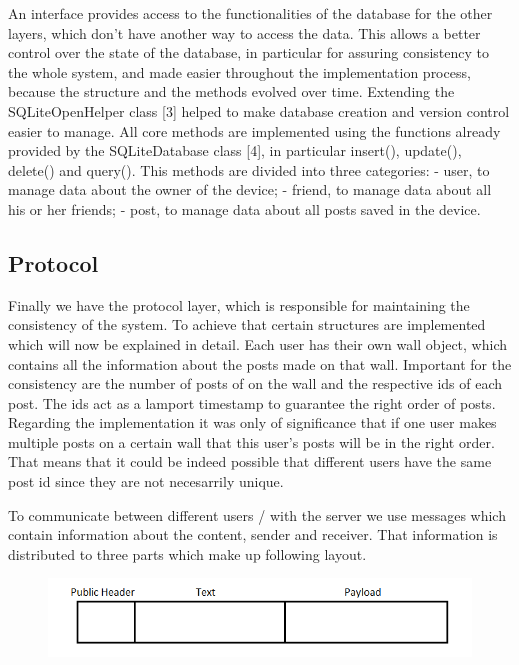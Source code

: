 \documentclass{report}
\newcommand{\lfig}[1]{\label{fig:#1}}
\begin{document}

An interface provides access to the functionalities of the database for the other layers, which don't have another way to access the data. This allows a better control over the state of the database, in particular for assuring consistency to the whole system, and made easier throughout the implementation process, because the structure and the methods evolved over time.
Extending the SQLiteOpenHelper class [3] helped to make database creation and version control easier to manage.
All core methods are implemented using the functions already provided by the SQLiteDatabase class [4], in particular insert(), update(), delete() and query(). This methods are divided into three categories:
- user, to manage data about the owner of the device;
- friend, to manage data about all his or her friends;
- post, to manage data about all posts saved in the device.

\subsection{Protocol}
Finally we have the protocol layer, which is responsible for maintaining the consistency of the system. To achieve that certain structures are implemented which will now be explained in detail.
Each user has their own wall object, which contains all the information about the posts made on that wall. Important for the consistency are the number of posts of on the wall and the respective ids of each post. The ids act as a lamport timestamp to guarantee the right order of posts. Regarding the implementation it was only of significance that if one user makes multiple posts on a certain wall that this user's posts will be in the right order. That means that it could be indeed possible that different users have the same post id since they are not necesarrily unique.

To communicate between different users / with the server we use messages which contain information about the content, sender and receiver. That information is distributed to three parts which make up following layout.

\begin{figure}[H]

	\centering
    \includegraphics[width=\columnwidth]{Layout.png}
    \lfig{Layout}
    \vspace{-5mm} %
\end{figure}
\end{document}
